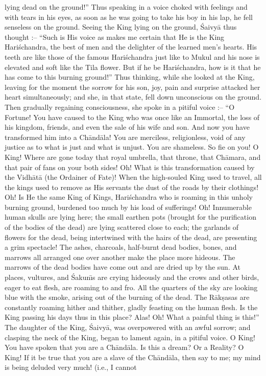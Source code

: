 lying dead on the ground!'' Thus speaking in a voice choked with feelings and with tears in his eyes, as soon as he was going to take his boy in his lap, he fell senseless on the ground. Seeing the King lying on the ground, \'Saivy\=a thus thought :-- ``Such is His voice as makes me certain that He is the King Hari\'schandra, the best of men and the delighter of the learned men's hearts. His teeth are like those of the famous Hari\'schandra just like to Mukul and his nose is elevated and soft like the Tila flower. But if he be Hari\'schandra, how is it that he has come to this burning ground!'' Thus thinking, while she looked at the King, leaving for the moment the sorrow for his son, joy, pain and surprise attacked her heart simultaneously; and she, in that state, fell down unconscious on the ground. Then gradually regaining consciousness, she spoke in a pitiful voice :-- ``O Fortune! You have caused to the King who was once like an Immortal, the loss of his kingdom, friends, and even the sale of his wife and son. And now you have transformed him into a Ch\=and\=ala! You are merciless, religionless, void of any justice as to what is just and what is unjust. You are shameless. So fie on you! O King! Where are gone today that royal umbrella, that throne, that Ch\=amara, and that pair of fans on your both sides! Oh! What is this transformation caused by the Vidh\=at\=a (the Ordainer of Fate)! When the high-souled King used to travel, all the kings used to remove as His servants the dust of the roads by their clothings! Oh! Is He the same King of Kings, Hari\'schandra who is roaming in this unholy burning ground, burdened too much by his load of sufferings! Oh! Innumerable human skulls are lying here; the small earthen pots (brought for the purification of the bodies of the dead) are lying scattered close to each; the garlands of flowers for the dead, being intertwined with the hairs of the dead, are presenting a grim spectacle! The ashes, charcoals, half-burnt dead bodies, bones, and marrows all arranged one over another make the place more hideous. The marrows of the dead bodies have come out and are dried up by the sun. At places, vultures, and \'Sakun\={\i}s are crying hideously and the crows and other birds, eager to eat flesh, are roaming to and fro. All the quarters of the sky are looking blue with the smoke, arising out of the burning of the dead. The R\=ak\d{s}asas are constantly roaming hither and thither, gladly feasting on the human flesh. Is the King passing his days thus in this place? Alas! Oh! What a painful thing is this!'' The daughter of the King, \'Saivy\=a, was overpowered with an awful sorrow; and clasping the neck of the King, began to lament again, in a pitiful voice. O King! You have spoken that you are a Ch\=and\=ala. Is this a dream? Or a Reality? O King! If it be true that you are a slave of the Ch\=and\=ala, then say to me; my mind is being deluded very much! (i.e., I cannot

